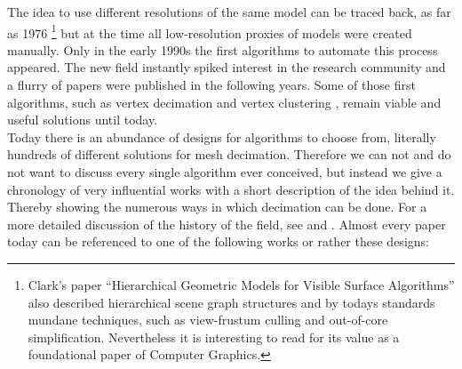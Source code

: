The idea to use different resolutions of the same model can be traced back, as far as 1976 \citep[cf.][]{Clark1976}\footnote{ Clark's 
paper ``Hierarchical Geometric Models for Visible Surface Algorithms'' also described hierarchical scene graph structures and by todays standards mundane techniques, such as view-frustum culling and out-of-core simplification. Nevertheless it is interesting to read for its value as a foundational paper of Computer Graphics.} but at the time all low-resolution proxies of models were created manually.
Only in the early 1990s the first algorithms to automate this process appeared.
The new field instantly spiked interest in the research community and a flurry of papers were published in the following years.
Some of those first algorithms, such as vertex decimation \citep[][]{Schroeder1992} and vertex clustering \citep[][]{Rossignac1993}, remain viable and useful solutions until today.\\
Today there is an abundance of designs for algorithms to choose from, literally hundreds of different solutions for mesh decimation.
Therefore we can not and do not want to discuss every single algorithm ever conceived, but instead we give a chronology of very influential works with a short description of the idea behind it.
Thereby showing the numerous ways in which decimation can be done.
For a more detailed discussion of the history of the field, see \citep[][cf. p.4 ff.]{Diaz-Goano1998} and \citep[][cf. p.8 ff.]{Luebke2002}.
Almost every paper today can be referenced to one of the following works or rather these designs:
